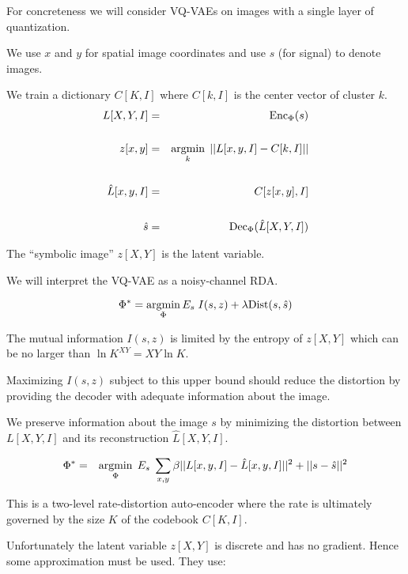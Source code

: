 {\vfill
For concreteness we will consider VQ-VAEs on images with a single layer of quantization.

\vfill
We use $x$ and $y$ for spatial image coordinates and use $s$ (for signal) to denote images.


We train a dictionary $C[K,I]$ where $C[k,I]$ is the center vector of cluster $k$.
\begin{eqnarray*}
L[X,Y,I] & = & \mathrm{Enc}_\Phi(s) \\
\\
z[x,y] & = & \operatorname*{argmin}_k \;||L[x,y,I] - C[k,I]|| \\
\\
\hat{L}[x,y,I] & = & C[z[x,y],I] \\
\\
\hat{s} & = & \mathrm{Dec}_\Phi(\hat{L}[X,Y,I])
\end{eqnarray*}

\vfill
The ``symbolic image'' $z[X,Y]$ is the latent variable.


We will interpret the VQ-VAE as a noisy-channel RDA.

$$\Phi^*  =  \operatorname*{argmin}_\Phi E_s\;I(s,z) + \lambda\mathrm{Dist}(s,\hat{s})$$

\vfill
The mutual information $I(s,z)$ is limited by the entropy of $z[X,Y]$ which can be no larger than $\ln K^{XY} = XY\ln K$.

\vfill
Maximizing $I(s,z)$ subject to this upper bound should reduce the distortion by providing the decoder with adequate information
about the image.


We preserve information about the image $s$ by minimizing the distortion between $L[X,Y,I]$ and its reconstruction $\hat{L}[X,Y,I]$.

\vfill
\begin{eqnarray*}
\Phi^* & = & \operatorname*{argmin}_\Phi \;E_s\; \sum_{x,y} \beta||L[x,y,I] - \hat{L}[x,y,I]||^2 + ||s -\hat{s}||^2
\end{eqnarray*}

\vfill
This is a two-level rate-distortion auto-encoder where the rate is ultimately governed by the size $K$ of the codebook $C[K,I]$.


Unfortunately the latent variable $z[X,Y]$ is discrete and has no gradient.  Hence some approximation must be used.  They use:

}
